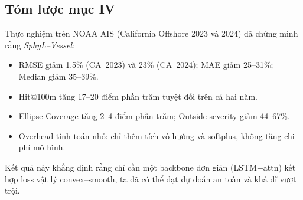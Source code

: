 \documentclass{IEEEtran}
\begin{document}
\subsection{Tóm lược mục IV}
Thực nghiệm trên NOAA AIS (California Offshore 2023 và 2024)
đã chứng minh rằng \emph{SphyL--Vessel}:
\begin{itemize}
  \item RMSE giảm 1.5\% (CA~2023) và 23\% (CA~2024);
        MAE giảm 25--31\%; Median giảm 35--39\%.
  \item Hit@100m tăng 17--20 điểm phần trăm tuyệt đối trên cả hai năm.
  \item Ellipse Coverage tăng 2--4 điểm phần trăm;
        Outside severity giảm 44--67\%.
  \item Overhead tính toán nhỏ: chỉ thêm tích vô hướng và softplus,
        không tăng chi phí mô hình.
\end{itemize}

Kết quả này khẳng định rằng chỉ cần một backbone đơn giản (LSTM+attn)
kết hợp loss vật lý convex--smooth,
ta đã có thể đạt dự đoán an toàn và khả dĩ vượt trội.
\end{document}
